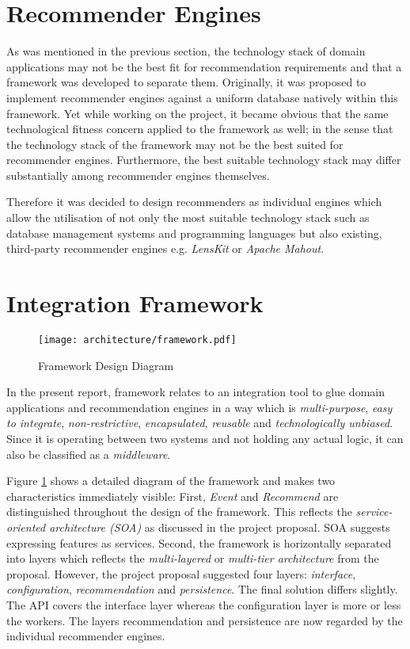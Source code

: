 \section{Recommender Engines}
\label{architecture-recommender-engines}

As was mentioned in the previous section, the technology stack of domain applications may not be the best fit for recommendation requirements and that a framework was developed to separate them. Originally, it was proposed to implement recommender engines against a uniform database natively within this framework. Yet while working on the project, it became obvious that the same technological fitness concern applied to the framework as well; in the sense that the technology stack of the framework may not be the best suited for recommender engines. Furthermore, the best suitable technology stack may differ substantially among recommender engines themselves.

Therefore it was decided to design recommenders as individual engines which allow the utilisation of not only the most suitable technology stack such as database management systems and programming languages but also existing, third-party recommender engines e.g. \emph{LensKit} or \emph{Apache Mahout}.

\section{Integration Framework}
\label{architecture-integration-framework}

\begin{figure}[ht]
    \texttt{[image: architecture/framework.pdf]}
    \caption{Framework Design Diagram}
    \label{fig:architecture-framework}
\end{figure}

In the present report, framework relates to an integration tool to glue domain applications and recommendation engines in a way which is \emph{multi-purpose}, \emph{easy to integrate}, \emph{non-restrictive}, \emph{encapsulated}, \emph{reusable} and \emph{technologically unbiased}. Since it is operating between two systems and not holding any actual logic, it can also be classified as a \emph{middleware}.

Figure \ref{fig:architecture-framework} shows a detailed diagram of the framework and makes two characteristics immediately visible: First, \emph{Event} and \emph{Recommend} are distinguished throughout the design of the framework. This reflects the \emph{service-oriented architecture (SOA)} as discussed in the project proposal. SOA suggests expressing features as services. Second, the framework is horizontally separated into layers which reflects the \emph{multi-layered} or \emph{multi-tier architecture} from the proposal. However, the project proposal suggested four layers: \emph{interface}, \emph{configuration}, \emph{recommendation} and \emph{persistence}. The final solution differs slightly. The API covers the interface layer whereas the configuration layer is more or less the workers. The layers recommendation and persistence are now regarded by the individual recommender engines.

